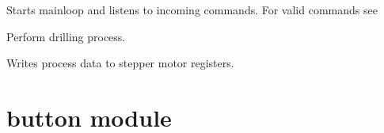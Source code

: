\documentclass[letterpaper,10pt,english]{sphinxmanual}
\begin{document}
\begin{fulllineitems}

\begin{fulllineitems}
\label{bohrvorrichtung:bohrvorrichtung.Bohrvorrichtung.start}
Starts mainloop and listens to incoming commands.
For valid commands see {\hyperref[commands:module\string-commands]{}}

\end{fulllineitems}


\begin{fulllineitems}
\label{bohrvorrichtung:bohrvorrichtung.Bohrvorrichtung.startDrilling}
Perform drilling process.

\end{fulllineitems}


\begin{fulllineitems}
\label{bohrvorrichtung:bohrvorrichtung.Bohrvorrichtung.writeProcessData}
Writes process data to stepper motor registers.

\end{fulllineitems}


\end{fulllineitems}



\section{button module}
\label{button::doc}\label{button:module-button}\label{button:button-module}
\end{document}
